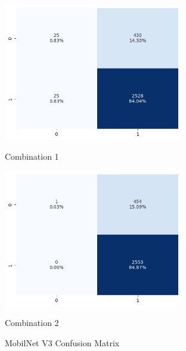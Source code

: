 \begin{figure}[H]
    \centering
    \begin{minipage}[b]{0.49\textwidth}
        \centering
        \includegraphics[width=\textwidth, height=6cm]{Figures/unbalanced_data/without bn/mn3/cm.png}
        \captionsetup{labelformat=empty}
        \caption{Combination 1}
        \label{fig:u_wo_r_cm}
    \end{minipage}
    \hfill
    \begin{minipage}[b]{0.49\textwidth}
        \centering
        \includegraphics[width=\textwidth, height=6cm]{Figures/unbalanced_data/with bn/mn3/cm.png}
        \captionsetup{labelformat=empty}
        \caption{Combination 2}
        \label{fig:u_w_r_cm}
    \end{minipage}
    \captionsetup{labelformat=default}
    \caption{MobilNet V3 Confusion Matrix}
\end{figure}



